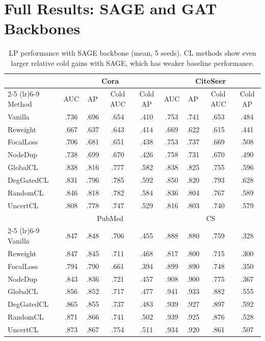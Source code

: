 \appendix
\section{Full Results: SAGE and GAT Backbones}
\label{app:full}

\begin{table}[h]
\centering
\small
\caption{LP performance with SAGE backbone (mean, 5 seeds). CL methods show even larger relative cold gains with SAGE, which has weaker baseline performance.}
\label{tab:main_sage}
\begin{tabular}{l cccc cccc}
\toprule
& \multicolumn{4}{c}{Cora} & \multicolumn{4}{c}{CiteSeer} \\
\cmidrule(lr){2-5} \cmidrule(lr){6-9}
Method & AUC & AP & Cold AUC & Cold AP & AUC & AP & Cold AUC & Cold AP \\
\midrule
Vanilla & .736 & .696 & .654 & .410 & .753 & .741 & .653 & .484 \\
Reweight & .667 & .637 & .643 & .414 & .669 & .622 & .615 & .441 \\
FocalLoss & .706 & .681 & .651 & .438 & .753 & .737 & .669 & .508 \\
NodeDup & .738 & .699 & .670 & .426 & .758 & .731 & .670 & .490 \\
GlobalCL & .838 & .816 & .777 & .582 & .838 & .825 & .755 & .596 \\
DegGatedCL & .831 & .796 & .785 & .592 & .850 & .820 & .793 & .628 \\
RandomCL & .846 & .818 & .782 & .584 & .836 & .804 & .767 & .589 \\
UncertCL & .808 & .778 & .747 & .529 & .816 & .803 & .740 & .579 \\
\midrule
& \multicolumn{4}{c}{PubMed} & \multicolumn{4}{c}{CS} \\
\cmidrule(lr){2-5} \cmidrule(lr){6-9}
Vanilla & .847 & .848 & .706 & .455 & .888 & .880 & .759 & .328 \\
Reweight & .847 & .845 & .711 & .468 & .817 & .800 & .715 & .300 \\
FocalLoss & .794 & .790 & .661 & .394 & .899 & .890 & .748 & .350 \\
NodeDup & .843 & .836 & .721 & .457 & .908 & .900 & .775 & .367 \\
GlobalCL & .856 & .852 & .717 & .477 & .941 & .933 & .882 & .555 \\
DegGatedCL & .865 & .855 & .737 & .483 & .939 & .927 & .897 & .592 \\
RandomCL & .871 & .866 & .741 & .502 & .939 & .925 & .876 & .528 \\
UncertCL & .873 & .867 & .754 & .511 & .934 & .920 & .861 & .507 \\
\bottomrule
\end{tabular}
\end{table}


